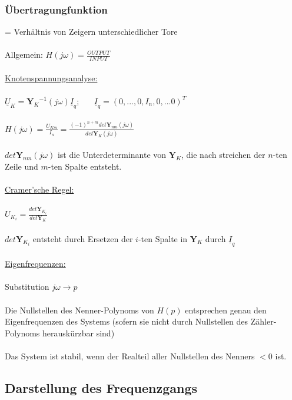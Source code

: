 \documentclass[a4paper,twocolumn,10pt]{article}
\begin{document}
\subsubsection*{Übertragungfunktion}
= Verhältnis von Zeigern unterschiedlicher Tore\\\\
Allgemein: $H(j\omega)=\frac{OUTPUT}{INPUT}$\\\\
\underline{Knotenspannungsanalyse:}\\\\
$\underline{U}_K={\textbf{Y}_K}^{-1}(j\omega)\underline{I}_q;\;\;\;\;\;\;\underline{I}_q=(0,...,0,I_n,0,...0)^T$\\\\
$H(j\omega)=\frac{U_{Km}}{I_n}=\frac{(-1)^{n+m}det\textbf{Y}_{nm}(j\omega)}{det\textbf{Y}_K(j\omega)}$\\\\
$det\textbf{Y}_{nm}(j\omega)$ ist die Unterdeterminante von $\textbf{Y}_K$, die nach streichen der $n$-ten Zeile und $m$-ten Spalte entsteht.\\\\
\underline{Cramer'sche Regel:}\\\\
$U_{K_i}=\frac{det\textbf{Y}_{K_i}}{det\textbf{Y}_K}$\\\\
$det\textbf{Y}_{K_i}$ entsteht durch Ersetzen der $i$-ten Spalte in $\textbf{Y}_K$ durch $\underline{I}_q$\\\\
\underline{Eigenfrequenzen:}\\\\
Substitution $j\omega \rightarrow p$\\\\
Die Nullstellen des Nenner-Polynoms von $H(p)$ entsprechen genau den Eigenfrequenzen des Systems (sofern sie nicht durch Nullstellen des Zähler-Polynoms herauskürzbar sind)\\\\
Das System ist stabil, wenn der Realteil aller Nullstellen des Nenners $<0$ ist.
\subsection*{Darstellung des Frequenzgangs}
\end{document}
